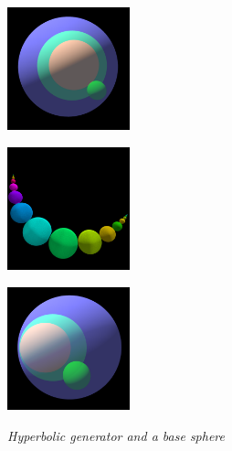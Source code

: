 \begin{figure}[h!tbp]
 \begin{minipage}{0.5\hsize}
  \begin{minipage}{0.25\hsize}
   \center
   \includegraphics[width=1.4in, height=1.4in, keepaspectratio]{./img/application/3dGen/loxoGenSimple.pdf}
   \label{fig:loxoGen3d}
  \end{minipage}
  \hspace*{\fill}
  \begin{minipage}{0.25\hsize}
   \center
   \includegraphics[width=1.4in, height=1.4in, keepaspectratio]{./img/application/3dGen/loxoOrbSimple.pdf}
   \label{fig:loxoOrb3d}
  \end{minipage}
  \hspace*{\fill}
 \caption{\textit{Hyperbolic generator and a base sphere}}
  \label{fig:loxo3d}
 \end{minipage}
 \hspace*{\fill}
 \begin{minipage}{0.5\hsize}
  \begin{minipage}{0.25\hsize}
   \center
   \includegraphics[width=1.4in, height=1.4in, keepaspectratio]{./img/application/3dGen/parabolicOneGen.pdf}
   \label{fig:parabolic3dGen}
  \end{minipage}
  \hspace*{\fill}

\end{minipage}
\end{figure}
